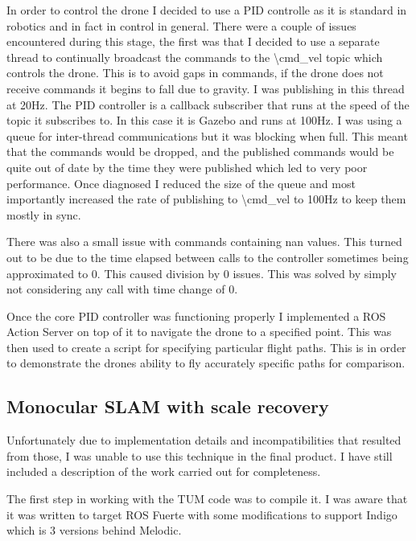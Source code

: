 \documentclass[]{../resources/final_report}
\begin{document}
In order to control the drone I decided to use a PID controlle as it is standard in robotics and in fact in 
control in general. There were a couple of issues encountered during this stage, the first was that I 
decided to use a separate thread to continually broadcast the commands to the \textbackslash cmd\_vel topic which controls the 
drone. This is to avoid gaps in commands, if the drone does not receive commands it begins to fall due to 
gravity. I was publishing in this thread at 20Hz. The PID controller is a callback subscriber that runs at the speed
of the topic it subscribes to. In this case it is Gazebo and runs at 100Hz. I was using a queue for inter-thread
communications but it was blocking when full. This meant that the commands would be dropped, and the published
commands would be quite out of date by the time they were published which led to very poor performance.
Once diagnosed I reduced the size of the queue and most importantly increased the rate of publishing to \textbackslash cmd\_vel 
to 100Hz to keep them mostly in sync.

There was also a small issue with commands containing nan values. This turned out to be due to the time 
elapsed between calls to the controller sometimes being approximated to 0. This caused division by 0 issues.
This was solved by simply not considering any call with time change of 0.

Once the core PID controller was functioning properly I implemented a ROS Action Server on top of it to 
navigate the drone to a specified point. This was then used to create a script for specifying particular
flight paths. This is in order to demonstrate the drones ability to fly accurately specific paths for comparison.


\subsection{Monocular SLAM with scale recovery}

Unfortunately due to implementation details and incompatibilities that resulted from those, I was
unable to use this technique in the final product. I have still included a description of the work
carried out for completeness.

The first step in working with the TUM code was to compile it. I was aware that it was written to 
target ROS Fuerte with some modifications to support Indigo which is 3 versions behind Melodic.
\end{document}

